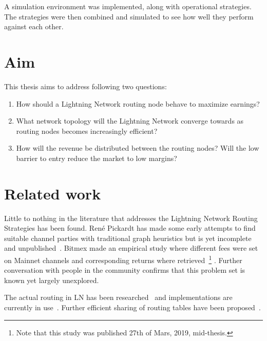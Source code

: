 A simulation environment was implemented, along with operational strategies. The strategies were then combined and simulated to see how well they perform against each other.

\section{Aim}
    \label{sec:aim}

This thesis aims to address following two questions:

	\begin{enumerate}
		\item How should a \gls{Lightning Network} routing node behave to maximize earnings?
	
		\item What network topology will the \gls{Lightning Network} converge towards as routing nodes becomes increasingly efficient?
		
		\item How will the revenue be distributed between the routing nodes? Will the low barrier to entry reduce the market to low margins? 
		
	\end{enumerate}
	
\section{Related work}
    \label{sec:related_work}

	Little to nothing in the literature that addresses the Lightning Network Routing Strategies has been found. René Pickardt has made some early attempts to find suitable channel parties with traditional graph heuristics but is yet incomplete and unpublished~\cite{repository:rene:pickard}. Bitmex made an empirical study where different fees were set on Mainnet channels and corresponding returns where retrieved~\cite{bitmex:fee}\footnote{Note that this study was published 27th of Mars, 2019, mid-thesis.} . Further conversation with people in the community confirms that this problem set is known yet largely unexplored.
	
	The actual routing in LN has been researched~\cite{distasi:avallone:cononico:routing} and implementations are currently in use~\cite{repository:clightning, repository:lnd, repository:eclair, repository:lit}. Further efficient sharing of routing tables have been proposed~\cite{gunspan:marco:ant}.
	

